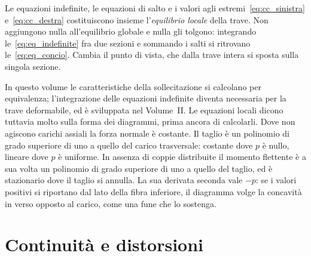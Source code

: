 Le equazioni indefinite, le equazioni di salto e i
valori agli estremi~\eqref{eq:cc_sinistra}
e~\eqref{eq:cc_destra} costituiscono insieme
l'\emph{equilibrio locale} della trave. Non aggiungono
nulla all'equilibrio globale e nulla gli tolgono:
integrando le~\eqref{eq:eq_indefinite} fra due sezioni
e sommando i salti si ritrovano le~\eqref{eq:eq_concio}.
Cambia il punto di vista, che dalla trave intera si
sposta sulla singola sezione.

In questo volume le caratteristiche della sollecitazione
si calcolano per equivalenza; l'integrazione delle
equazioni indefinite diventa necessaria per la trave
deformabile, ed è sviluppata nel Volume~II. Le equazioni
locali dicono tuttavia molto sulla forma dei diagrammi,
prima ancora di calcolarli. Dove non agiscono carichi
assiali la forza normale è costante. Il taglio è un
polinomio di grado superiore di uno a quello del carico
trasversale: costante dove $p$ è nullo, lineare dove $p$
è uniforme. In assenza di coppie distribuite il momento
flettente è a sua volta un polinomio di grado superiore
di uno a quello del taglio, ed è stazionario dove il
taglio si annulla. La sua derivata seconda vale $-p$: se
i valori positivi si riportano dal lato della fibra
inferiore, il diagramma volge la concavità in verso
opposto al carico, come una fune che lo sostenga.



\section{Continuità e distorsioni}
\label{sec:continuita_trave}

